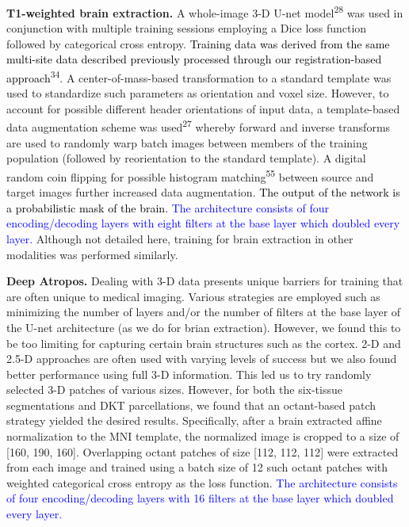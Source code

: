 \documentclass[12pt,]{article}
\begin{document}
\textbf{T1-weighted brain extraction.} A whole-image 3-D U-net
model\textsuperscript{28} was used in conjunction with multiple training
sessions employing a Dice loss function followed by categorical cross
entropy. \textcolor{black}{Training data
was derived from the same multi-site data described previously processed through
our registration-based approach}\textsuperscript{34}. A
center-of-mass-based transformation to a standard template was used to
standardize such parameters as orientation and voxel size. However, to
account for possible different header orientations of input data, a
template-based data augmentation scheme was used\textsuperscript{27}
whereby forward and inverse transforms are used to randomly warp batch
images between members of the training population (followed by
reorientation to the standard template). A digital random coin flipping
for possible histogram matching\textsuperscript{55} between source and
target images further increased data augmentation.
\textcolor{black}{The output of the network
is a probabilistic mask of the brain.} \textcolor{blue}{The architecture
consists of four encoding/decoding layers with eight filters at the base layer
which doubled every layer.} Although not detailed here, training for
brain extraction in other modalities was performed similarly.

\textbf{Deep Atropos.} Dealing with 3-D data presents unique barriers
for training that are often unique to medical imaging. Various
strategies are employed such as minimizing the number of layers and/or
the number of filters at the base layer of the U-net architecture (as we
do for brian extraction). However, we found this to be too limiting for
capturing certain brain structures such as the cortex. 2-D and 2.5-D
approaches are often used with varying levels of success but we also
found better performance using full 3-D information. This led us to try
randomly selected 3-D patches of various sizes. However, for both the
six-tissue segmentations and DKT parcellations, we found that an
octant-based patch strategy yielded the desired results. Specifically,
after a brain extracted affine normalization to the MNI template, the
normalized image is cropped to a size of {[}160, 190, 160{]}.
Overlapping octant patches of size {[}112, 112, 112{]} were extracted
from each image and trained using a batch size of 12 such octant patches
with weighted categorical cross entropy as the loss function.
\textcolor{blue}{The architecture consists of four encoding/decoding
layers with 16 filters at the base layer which doubled every layer.}
\end{document}
